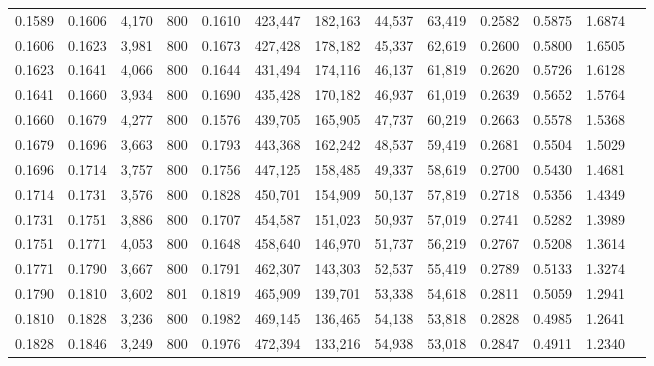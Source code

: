 \begin{tabular}{rrrrrrrrrrrrr}
0.1589 & 0.1606 &  4,170 & 800 &                                     0.1610 & 423,447 & 182,163 &  44,537 &  63,419 & 0.2582 & 0.5875 & 1.6874 \\
0.1606 & 0.1623 &  3,981 & 800 &                                     0.1673 & 427,428 & 178,182 &  45,337 &  62,619 & 0.2600 & 0.5800 & 1.6505 \\
0.1623 & 0.1641 &  4,066 & 800 &                                     0.1644 & 431,494 & 174,116 &  46,137 &  61,819 & 0.2620 & 0.5726 & 1.6128 \\
0.1641 & 0.1660 &  3,934 & 800 &                                     0.1690 & 435,428 & 170,182 &  46,937 &  61,019 & 0.2639 & 0.5652 & 1.5764 \\
0.1660 & 0.1679 &  4,277 & 800 &                                     0.1576 & 439,705 & 165,905 &  47,737 &  60,219 & 0.2663 & 0.5578 & 1.5368 \\
0.1679 & 0.1696 &  3,663 & 800 &                                     0.1793 & 443,368 & 162,242 &  48,537 &  59,419 & 0.2681 & 0.5504 & 1.5029 \\
0.1696 & 0.1714 &  3,757 & 800 &                                     0.1756 & 447,125 & 158,485 &  49,337 &  58,619 & 0.2700 & 0.5430 & 1.4681 \\
0.1714 & 0.1731 &  3,576 & 800 &                                     0.1828 & 450,701 & 154,909 &  50,137 &  57,819 & 0.2718 & 0.5356 & 1.4349 \\
0.1731 & 0.1751 &  3,886 & 800 &                                     0.1707 & 454,587 & 151,023 &  50,937 &  57,019 & 0.2741 & 0.5282 & 1.3989 \\
0.1751 & 0.1771 &  4,053 & 800 &                                     0.1648 & 458,640 & 146,970 &  51,737 &  56,219 & 0.2767 & 0.5208 & 1.3614 \\
0.1771 & 0.1790 &  3,667 & 800 &                                     0.1791 & 462,307 & 143,303 &  52,537 &  55,419 & 0.2789 & 0.5133 & 1.3274 \\
0.1790 & 0.1810 &  3,602 & 801 &                                     0.1819 & 465,909 & 139,701 &  53,338 &  54,618 & 0.2811 & 0.5059 & 1.2941 \\
0.1810 & 0.1828 &  3,236 & 800 &                                     0.1982 & 469,145 & 136,465 &  54,138 &  53,818 & 0.2828 & 0.4985 & 1.2641 \\
0.1828 & 0.1846 &  3,249 & 800 &                                     0.1976 & 472,394 & 133,216 &  54,938 &  53,018 & 0.2847 & 0.4911 & 1.2340 \\

\end{tabular}
